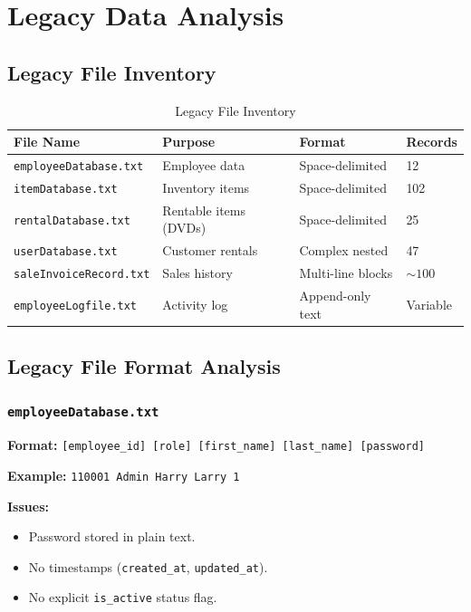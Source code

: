 \section{Legacy Data Analysis}

\subsection{Legacy File Inventory}

\begin{table}[h]
  \centering
  \caption{Legacy File Inventory}
  \begin{tabular}{p{4cm} p{4cm} p{3cm} p{2cm}}
    \toprule
    \textbf{File Name} & \textbf{Purpose} & \textbf{Format} & \textbf{Records} \\
    \midrule
    \texttt{employeeDatabase.txt} & Employee data & Space-delimited & 12 \\
    \texttt{itemDatabase.txt}     & Inventory items & Space-delimited & 102 \\
    \texttt{rentalDatabase.txt}   & Rentable items (DVDs) & Space-delimited & 25 \\
    \texttt{userDatabase.txt}     & Customer rentals & Complex nested & 47 \\
    \texttt{saleInvoiceRecord.txt} & Sales history & Multi-line blocks & $\sim 100$ \\
    \texttt{employeeLogfile.txt}  & Activity log & Append-only text & Variable \\
    \bottomrule
  \end{tabular}
\end{table}

\subsection{Legacy File Format Analysis}

\subsubsection*{\texttt{employeeDatabase.txt}}

\textbf{Format:} \texttt{[employee\_id] [role] [first\_name] [last\_name] [password]}

\textbf{Example:} \texttt{110001 Admin Harry Larry 1}

\textbf{Issues:}
\begin{itemize}[leftmargin=1.2cm]
  \item Password stored in plain text.
  \item No timestamps (\texttt{created\_at}, \texttt{updated\_at}).
  \item No explicit \texttt{is\_active} status flag.
\end{itemize}

